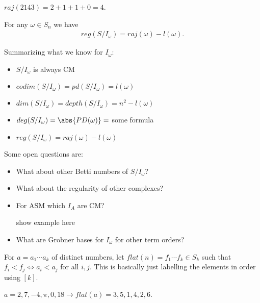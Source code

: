 \begin{example}
    $raj(2143) = 2 + 1 + 1 + 0 = 4$.
\end{example}

\begin{theorem}
    For any $\omega \in S_n$ we have
    \begin{align*}
        reg(S/ I_\omega ) = raj(\omega ) - l(\omega).
    \end{align*}
\end{theorem}

\begin{remark}
    Summarizing what we know for $I_\omega$:
    \begin{itemize}
        \item $S/I_\omega$ is always CM
        \item $codim (S/I_\omega) = pd (S/I_\omega) = l(\omega)$
        \item $dim (S/I_\omega) = depth (S/I_\omega) = n^2 - l(\omega)$
        \item $deg(S/I_\omega)  = \abs{PD(\omega) } = $ some formula
        \item $reg (S/I_\omega ) = raj (\omega) - l(\omega) $
    \end{itemize}
\end{remark}

\begin{remark}
    Some open questions are:
    \begin{itemize}
        \item What about other Betti numbers of $S/I_\omega$?
        \item What about the regularity of other complexes?
        \item For ASM which $I_A$ are CM?
        \begin{example}
            show example here
        \end{example}
        \item What are Grobner bases for $I_\omega$ for other term orders?
    \end{itemize}
\end{remark}

For $a = a_1 \cdots a_k$ of distinct numbers, let $flat(n) = f_1 \cdots f_k \in S_k$ such that $f_i < f_j \iff a_i < a_j$ for all $i,j$. This is basically just labelling the elements in order using $[k]$.

\begin{example}
    $a = 2,7,-4,\pi ,0 ,18 \rightarrow flat(a) = 3,5,1,4,2,6$.
\end{example}

